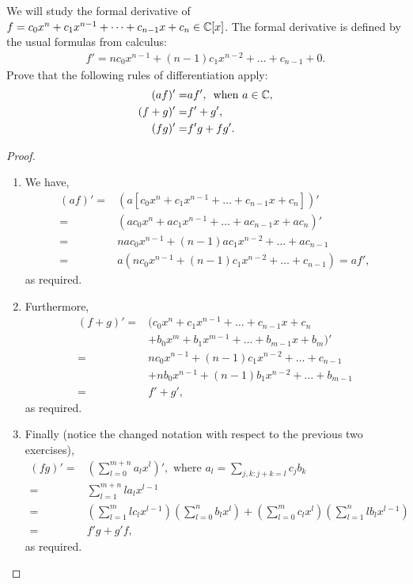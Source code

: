 \begin{exercise}{13}
We will study the formal derivative of $f=c_0x^n+c_1x^{n-1}+\dots+c_{n-1}x+c_n\in\mathbb{C}[x]$. 
The formal derivative is defined by the usual formulas from calculus:
\begin{align*}
    f'=nc_0x^{n-1}+(n-1)c_1x^{n-2}+\dots+c_{n-1}+0.
\end{align*}
Prove that the following rules of differentiation apply:
\begin{align*}
    (af)' =& af',\, \text{ when } a\in\mathbb{C},\\
    (f+g)' =& f' + g',\\
    (fg)' =& f'g + fg'.
\end{align*}
\end{exercise}
\begin{proof}
\begin{enumerate}
    \item We have,
    \begin{align*}
        (af)' =& (a[c_0x^n+c_1x^{n-1}+\dots+c_{n-1}x+c_n])'\\ 
        =& (ac_0x^n+ac_1x^{n-1}+\dots+ac_{n-1}x+ac_n)'\\
        =& nac_0x^{n-1}+(n-1)ac_1x^{n-2}+\dots+ac_{n-1}\\ 
        =& a(nc_0x^{n-1}+(n-1)c_1x^{n-2}+\dots+c_{n-1}) =af',
    \end{align*}
    as required.
    \item Furthermore,
    \begin{align*}
        (f+g)' =& (c_0x^n+c_1x^{n-1}+\dots+c_{n-1}x+c_n\\ &+b_0x^m+b_1x^{m-1}+\dots+b_{m-1}x+b_m)'\\
        =& nc_0x^{n-1}+(n-1)c_1x^{n-2}+\dots+c_{n-1}\\
        &+ nb_0x^{n-1}+(n-1)b_1x^{n-2}+\dots+b_{m-1}\\
        =& f' + g',
    \end{align*}
    as required.
    \item Finally (notice the changed notation with respect to the previous two exercises),
    \begin{align*}
        (fg)' =& (\sum_{l=0}^{m+n}a_lx^l)',\text{ where }a_l=\sum_{j,k: j+k=l}c_jb_k\\
        =& \sum_{l=1}^{m+n}la_lx^{l-1}\\
        =& (\sum_{l=1}^{m}lc_lx^{l-1})(\sum_{l=0}^{n}b_lx^{l}) + (\sum_{l=0}^{m}c_lx^{l})(\sum_{l=1}^{n}lb_lx^{l-1})\\
        =& f'g + g'f,
    \end{align*}
    as required.
\end{enumerate}
\end{proof}

